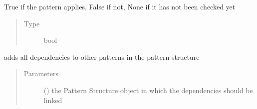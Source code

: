 \documentclass[letterpaper,10pt,english]{sphinxmanual}
\begin{document}
\begin{fulllineitems}
\begin{fulllineitems}
\end{fulllineitems}


\begin{fulllineitems}
\label{\detokenize{event_log_analyzer:event_log_analyzer.pattern_library.pattern.Pattern.applies}}
\sphinxAtStartPar
True if the pattern applies, False if not, None if it has not been checked yet
\begin{quote}\begin{description}
\item[{Type}] \leavevmode
\sphinxAtStartPar
bool

\end{description}\end{quote}

\end{fulllineitems}


\begin{fulllineitems}
\label{\detokenize{event_log_analyzer:event_log_analyzer.pattern_library.pattern.Pattern.add_dependencies}}
\sphinxAtStartPar
adds all dependencies to other patterns in the pattern structure
\begin{quote}\begin{description}
\item[{Parameters}] \leavevmode
\sphinxAtStartPar
{} ({\hyperref[\detokenize{event_log_analyzer:event_log_analyzer.pattern_library.pattern_structure.PatternStructure}]{}}) \textendash{} the Pattern Structure object in which the dependencies should be linked

\end{description}\end{quote}

\end{fulllineitems}



\end{fulllineitems}
\end{document}
